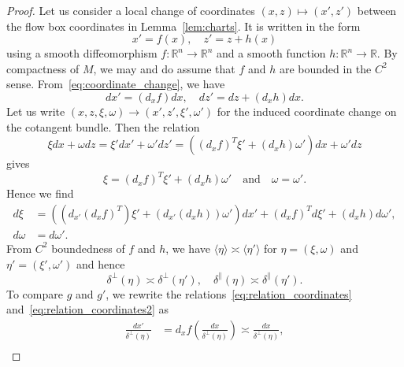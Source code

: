 \documentclass[10pt]{amsart}
\theoremstyle{definition}\newtheorem{defi}[theo]{Definition}\newtheorem{rema}[theo]{Remark}\newtheorem{exam}[theo]{Example}\newtheorem{exem}[theo]{Example}\newtheorem{nota}[theo]{Notation}
\newcommand{\bbR}{\mathbb{R}}
\begin{document}
\begin{proof}
Let us consider a local change of coordinates $(x,z)\mapsto(x',z')$ between the flow box coordinates in Lemma~\ref{lem:charts}. It is written in the form
\begin{equation}\label{eq:coordinate_change}
x'=f\left(x\right),\quad z'=z+h\left(x\right)
\end{equation}
using a smooth diffeomorphism $f:\bbR^{n}\rightarrow\bbR^{n}$ and a smooth function $h:\bbR^{n}\rightarrow\bbR$. By compactness of $M$, we may and do assume that $f$ and $h$ are bounded in the $C^{2}$ sense. From~\eqref{eq:coordinate_change}, we have
\begin{equation}\label{eq:relation_coordinates}
dx'=\left(d_{x}f\right)dx,\quad dz'=dz+\left(d_{x}h\right)dx.
\end{equation}
Let us write $(x,z,\xi,\omega)\to(x',z',\xi',\omega')$ for the induced coordinate change on the cotangent bundle. Then the relation
\[
\xi dx+\omega dz=\xi'dx'+\omega'dz'=\left(\left(d_{x}f\right)^{T}\xi'+\left(d_{x}h\right)\omega'\right)dx+\omega'dz
\]
gives
\begin{equation}\label{eq:dd}
\xi=\left(d_{x}f\right)^{T}\xi'+\left(d_{x}h\right)\omega'\quad\text{and}\quad\omega=\omega'.
\end{equation}
Hence we find
\begin{equation}\label{eq:relation_coordinates2}
\begin{split}
d\xi & =\left(\left(d_{x'}\left(d_{x}f\right)^{T}\right)\xi'+\left(d_{x'}\left(d_{x}h\right)\right)\omega'\right)dx'+\left(d_{x}f\right)^{T}d\xi'+\left(d_{x}h\right)d\omega',
\\
d\omega & =d\omega'.
\end{split}
\end{equation}
From $C^{2}$ boundedness of $f$ and $h$, we have $\langle \eta\rangle \asymp\langle \eta'\rangle $ for $\eta=(\xi,\omega)$ and $\eta'=(\xi',\omega')$ and hence
\begin{equation}\label{eq:equivalence_of_delta}
\delta^{\perp}\left(\eta\right)\asymp\delta^{\perp}\left(\eta'\right),\quad\delta^{\parallel}\left(\eta\right)\asymp\delta^{\parallel}\left(\eta'\right).
\end{equation}
To compare $g$ and $g'$, we rewrite the relations~\eqref{eq:relation_coordinates} and~\eqref{eq:relation_coordinates2} as
\begin{align*}
\frac{dx'}{\delta^{\perp}\left(\eta\right)} & =d_{x}f\left(\frac{dx}{\delta^{\perp}\left(\eta\right)}\right)\asymp\frac{dx}{\delta^{\perp}\left(\eta\right)},\\

\end{align*}
\end{proof}
\end{document}
